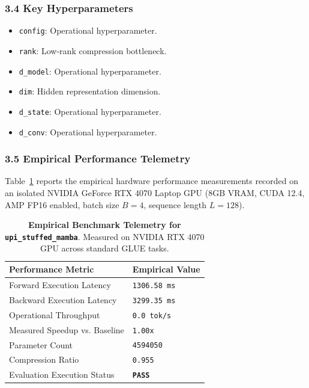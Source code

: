 \subsubsection*{3.4 Key Hyperparameters}
\begin{itemize}
    \item \texttt{config}: Operational hyperparameter.
    \item \texttt{rank}: Low-rank compression bottleneck.
    \item \texttt{d\_model}: Operational hyperparameter.
    \item \texttt{dim}: Hidden representation dimension.
    \item \texttt{d\_state}: Operational hyperparameter.
    \item \texttt{d\_conv}: Operational hyperparameter.
\end{itemize}

\subsubsection*{3.5 Empirical Performance Telemetry}
Table~\ref{tab:telemetry_upi_stuffed_mamba} reports the empirical hardware performance measurements recorded on an isolated NVIDIA GeForce RTX 4070 Laptop GPU (8GB VRAM, CUDA 12.4, AMP FP16 enabled, batch size $B=4$, sequence length $L=128$).

\begin{table}[h]
\centering
\small
\caption{\textbf{Empirical Benchmark Telemetry for \texttt{upi\_stuffed\_mamba}}. Measured on NVIDIA RTX 4070 GPU across standard GLUE tasks.}
\label{tab:telemetry_upi_stuffed_mamba}
\begin{tabularx}{\columnwidth}{lX}
\toprule
\textbf{Performance Metric} & \textbf{Empirical Value} \\
\midrule
Forward Execution Latency & \texttt{1306.58 ms} \\
Backward Execution Latency & \texttt{3299.35 ms} \\
Operational Throughput & \texttt{0.0 tok/s} \\
Measured Speedup vs. Baseline & \texttt{1.00x} \\
Parameter Count & \texttt{4594050} \\
Compression Ratio & \texttt{0.955} \\
Evaluation Execution Status & \textbf{\texttt{PASS}} \\
\bottomrule
\end{tabularx}
\end{table}

